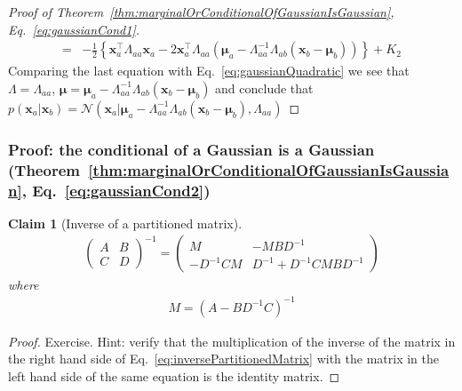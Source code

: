 \documentclass[11pt]{beamer}
\newtheorem{claim}{Claim}
\begin{document}
\begin{frame}
\begin{proof}[Proof of Theorem~\ref{thm:marginalOrConditionalOfGaussianIsGaussian}, Eq.~\ref{eq:gaussianCond1}]
\begin{align*}
			                  =&-\frac{1}{2}\left\{\mathbf{x}_a^\intercal\Lambda_{aa}\mathbf{x}_a-2\mathbf{x}_a^\intercal\Lambda_{aa}(\boldsymbol{\mu}_a-\Lambda_{aa}^{-1}\Lambda_{ab}(\mathbf{x}_b-\boldsymbol{\mu}_b))\right\}+K_2
		\end{align*}
		Comparing the last equation with Eq.~\ref{eq:gaussianQuadratic} we see that $\Lambda=\Lambda_{aa}$, $\boldsymbol{\mu}=\boldsymbol{\mu}_a-\Lambda_{aa}^{-1}\Lambda_{ab}(\mathbf{x}_b-\boldsymbol{\mu}_b)$ and conclude that $p(\mathbf{x}_a|\mathbf{x}_b)=\mathcal{N}(\mathbf{x}_a|\boldsymbol{\mu}_a-\Lambda_{aa}^{-1}\Lambda_{ab}(\mathbf{x}_b-\boldsymbol{\mu}_b),\Lambda_{aa})$
		\normalsize
	\end{proof}
\end{frame}

\begin{frame}
    \frametitle{Proof: the conditional of a Gaussian is a Gaussian (Theorem~\ref{thm:marginalOrConditionalOfGaussianIsGaussian}, Eq.~\ref{eq:gaussianCond2})}

	\begin{claim}[Inverse of a partitioned matrix]
		\begin{align}
			\left(\begin{array}{cc}
				      A & B\\
				      C & D
				  \end{array}\right)^{-1}=
			\left(\begin{array}{cc}
				      M         & -MBD^{-1}\\
					  -D^{-1}CM & D^{-1} + D^{-1}CMBD^{-1}
				  \end{array}\right)\label{eq:inversePartitionedMatrix}
		\end{align}
		where
		\begin{align*}
			M = (A - BD^{-1}C)^{-1}
		\end{align*}
	\end{claim}
	\begin{proof}
		\scriptsize
		Exercise. Hint: verify that the multiplication of the inverse of the matrix in the right hand side of Eq.~\ref{eq:inversePartitionedMatrix} with the matrix in the left hand side of the same equation is the identity matrix.
		\phantom\qedhere
		\normalsize
	\end{proof}
\end{frame}
\end{document}
